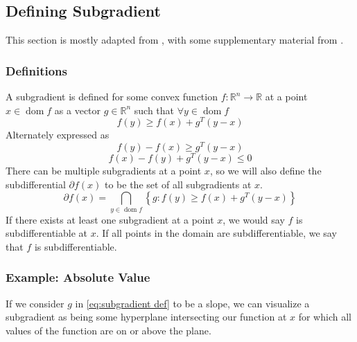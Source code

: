 \documentclass[journal,onecolumn]{IEEEtran}
\DeclareMathOperator{\dom}{dom}
\begin{document}
\subsection{Defining Subgradient}\label{sec:math subgrad}
This section is mostly adapted from \cite{boydvandenberghesubgradient}, with some supplementary material from \cite{boydparksubgradients}.
\subsubsection{Definitions}
A subgradient is defined for some convex function \(f: \mathbb{R}^n \rightarrow \mathbb{R}\) at a point \(x \in \dom f\) as a vector \(g \in \mathbb{R}^n\) such that \(\forall y \in \dom f\)
\begin{equation}\label{eq:subgradient def}
f(y) \geq f(x) + g^T (y-x) 
\end{equation}
Alternately expressed as
\begin{equation}\label{eq:modified subradient def 2}
    f(y) - f(x) \geq g^T(y-x)
\end{equation}
\begin{equation}\label{eq:modified subgradient def}
    f(x) - f(y) + g^T(y-x) \leq 0
\end{equation}
There can be multiple subgradients at a point \(x\), so we will also define the subdifferential \(\partial f(x)\) to be the set of all subgradients at \(x\).
\begin{equation}\label{eq:math subdifferential}
\partial f(x) = \bigcap_{y \in \dom f} \left\{ g : f(y) \geq f(x) + g^T (y-x)\right\}
\end{equation}
If there exists at least one subgradient at a point \(x\), we would say \(f\) is subdifferentiable at \(x\). If all points in the domain are subdifferentiable, we say that \(f\) is subdifferentiable.

\subsubsection{Example: Absolute Value}
If we consider \(g\) in \eqref{eq:subgradient def} to be a slope, we can visualize a subgradient as being some hyperplane intersecting our function at \(x\) for which all values of the function are on or above the plane. 
\end{document}
